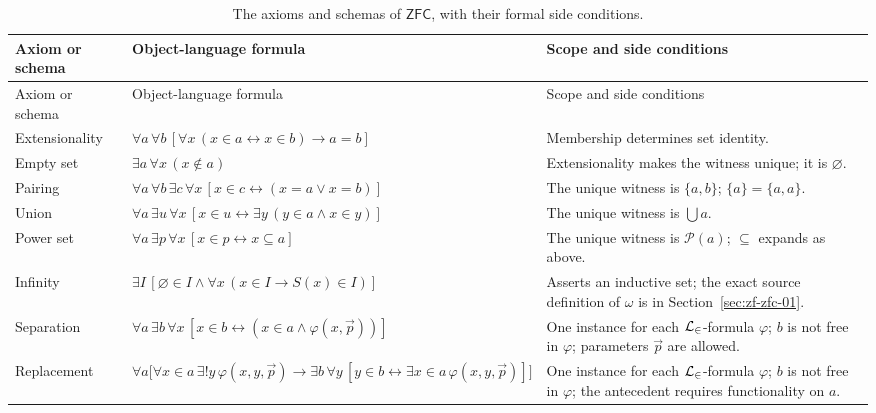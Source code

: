 \begingroup\footnotesize
\begin{longtable}{@{}p{}p{}p{}@{}}
\caption{The axioms and schemas of \(\mathsf{ZFC}\), with their formal side
conditions.}\label{tab:p06-zfc-axioms}\\
\toprule
Axiom or schema & Object-language formula & Scope and side conditions \\
\midrule
\endfirsthead
\toprule
Axiom or schema & Object-language formula & Scope and side conditions \\
\midrule
\endhead
Extensionality\index{Axiom of Extensionality} &
\(\forall a\,\forall b\,[\forall x\,(x\in a\leftrightarrow x\in b)\to a=b]\) &
Membership determines set identity. \\
\addlinespace
Empty set\index{empty-set axiom} &
\(\exists a\,\forall x\,(x\notin a)\) &
Extensionality makes the witness unique; it is \(\varnothing\). \\
\addlinespace
Pairing\index{pairing axiom} &
\(\forall a\,\forall b\,\exists c\,\forall x\,[x\in c\leftrightarrow
(x=a\lor x=b)]\) &
The unique witness is \(\{a,b\}\); \(\{a\}=\{a,a\}\). \\
\addlinespace
Union\index{union axiom} &
\(\forall a\,\exists u\,\forall x\,[x\in u\leftrightarrow
\exists y\,(y\in a\land x\in y)]\) &
The unique witness is \(\bigcup a\). \\
\addlinespace
Power set\index{power-set axiom} &
\(\forall a\,\exists p\,\forall x\,[x\in p\leftrightarrow x\subseteq a]\) &
The unique witness is \(\mathcal P(a)\); \(\subseteq\) expands as above. \\
\addlinespace
Infinity\index{axiom of infinity} &
\(\exists I\,[\varnothing\in I\land
\forall x\,(x\in I\to S(x)\in I)]\) &
Asserts an inductive set; the exact source definition of \(\omega\) is in
Section~\ref{sec:zf-zfc-01}. \\
\addlinespace
Separation\index{separation schema} &
\(\forall a\,\exists b\,\forall x\,[x\in b\leftrightarrow
(x\in a\land\varphi(x,\vec p))]\) &
One instance for each \(\mathcal{L}_{\in}\)-formula \(\varphi\); \(b\) is not free
in \(\varphi\); parameters \(\vec p\) are allowed. \\
\addlinespace
Replacement\index{replacement schema} &
\(\displaystyle
\forall a\bigl[\forall x\in a\,\exists!y\,\varphi(x,y,\vec p)\to
\exists b\,\forall y\,[y\in b\leftrightarrow
\exists x\in a\,\varphi(x,y,\vec p)]\bigr]\) &
One instance for each \(\mathcal{L}_{\in}\)-formula \(\varphi\); \(b\) is not free
in \(\varphi\); the antecedent requires functionality on \(a\). \\

\end{longtable}
